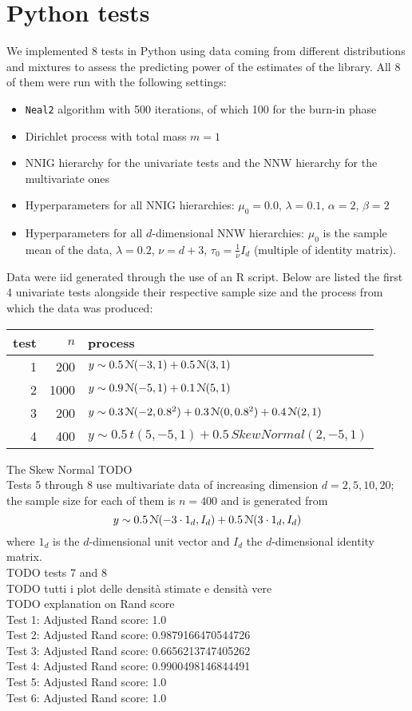 \chapter{Python tests}
We implemented 8 tests in Python using data coming from different distributions and mixtures to assess the predicting power of the estimates of the library.
All 8 of them were run with the following settings:
\begin{itemize}
	\item \verb|Neal2| algorithm with 500 iterations, of which 100 for the burn-in phase
	\item Dirichlet process with total mass $m=1$
	\item NNIG hierarchy for the univariate tests and the NNW hierarchy for the multivariate ones
	\item Hyperparameters for all NNIG hierarchies: $\mu_0 = 0.0$, $\lambda = 0.1$, $\alpha = 2$, $\beta = 2$
	\item Hyperparameters for all $d$-dimensional NNW hierarchies: $\mu_0$ is the sample mean of the data, $\lambda = 0.2$, $\nu = d + 3$, $\tau_0 = \frac{1}{\nu} I_d$ (multiple of identity matrix).
\end{itemize}
Data were iid generated through the use of an R script.
Below are listed the first 4 univariate tests alongside their respective sample size and the process from which the data was produced:
\begin{center}
	\begin{tabular}{r|r|l}
		test & $n$ & process \\ \hline
		1 &  200 & $y \sim 0.5 \, \mathcal N(-3, 1) + 0.5 \, \mathcal N(3, 1)$ \\
		2 & 1000 & $y \sim 0.9 \, \mathcal N(-5, 1) + 0.1 \, \mathcal N(5, 1)$ \\
		3 &  200 & $y \sim 0.3 \, \mathcal N(-2, 0.8^2) + 0.3 \, \mathcal N(0, 0.8^2) + 0.4 \, \mathcal N(2, 1)$ \\
		4 &  400 & $y \sim 0.5 \, t(5, -5, 1 ) + 0.5 \, SkewNormal(2, -5, 1)$
	\end{tabular}
\end{center}
The Skew Normal TODO \\
Tests 5 through 8 use multivariate data of increasing dimension $d = 2,5,10,20$; the sample size for each of them is $n=400$ and is generated from
$$y \sim 0.5 \, \mathcal N(-3 \cdot 1_d, I_d) + 0.5 \, \mathcal N(3 \cdot 1_d, I_d)$$
where $1_d$ is the $d$-dimensional unit vector and $I_d$ the $d$-dimensional identity matrix. \\
TODO tests 7 and 8 \\
TODO tutti i plot delle densità stimate e densità vere \\
TODO explanation on Rand score \\
Test 1: Adjusted Rand score: 1.0 \\
Test 2: Adjusted Rand score: 0.9879166470544726 \\
Test 3: Adjusted Rand score: 0.6656213747405262 \\
Test 4: Adjusted Rand score: 0.9900498146844491 \\
Test 5: Adjusted Rand score: 1.0 \\
Test 6: Adjusted Rand score: 1.0

